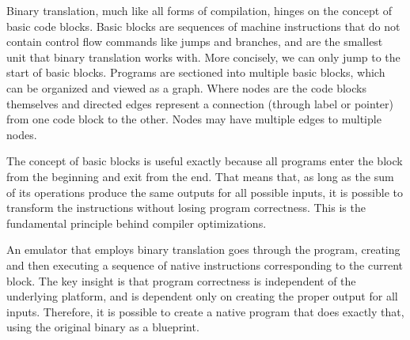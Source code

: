 Binary translation, much like all forms of compilation, hinges on the concept
of basic code blocks.  Basic blocks are sequences of machine instructions that
do not contain control flow commands like jumps and branches, and are the
smallest unit that binary translation works with.  More concisely, we can only
jump to the start of basic blocks. Programs are sectioned into multiple basic
blocks, which can be organized and viewed as a graph. Where nodes are the code
blocks themselves and directed edges represent a connection (through label or pointer)
from one code block to the other.  Nodes may have multiple edges to multiple nodes.

The concept of basic blocks is useful exactly because all programs enter the 
block from the beginning and exit from the end. That means that, as long as
the sum of its operations produce the same outputs for all possible inputs,
it is possible to transform the instructions without losing program correctness.
This is the fundamental principle behind compiler optimizations.

An emulator that employs binary translation goes through the program, creating and 
then executing a sequence of native instructions corresponding to the current block.
The key insight is that program correctness is independent of the underlying
platform, and is dependent only on creating the proper output for all inputs.
Therefore, it is possible to create a native program that does exactly that, using 
the original binary as a blueprint.




